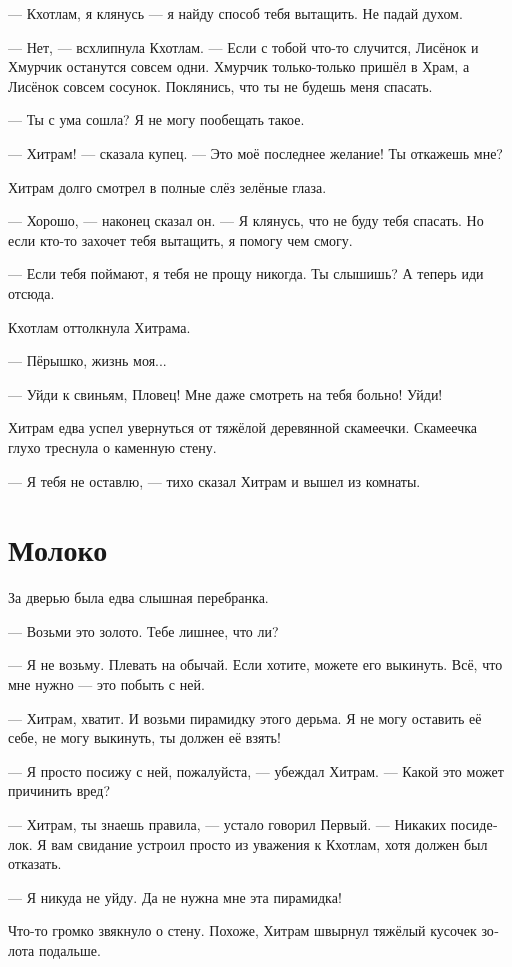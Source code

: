 \documentclass[a4paper,12pt,fleqn]{book}\usepackage{cooltooltips}\usepackage{polyglossia}\setdefaultlanguage{russian}\setotherlanguage{english}\defaultfontfeatures{Ligatures=TeX,Mapping=tex-text} \usepackage{xcolor}\definecolor{lightgray}{HTML}{bbbbbb}\color{lightgray}\newcommand{\ml}[3]{\textenglish{\textcolor{black}{#3}}}
\begin{document}
--- Кхотлам, я клянусь --- я найду способ тебя вытащить.
Не падай духом.

--- Нет, --- всхлипнула Кхотлам.
--- Если с тобой что-то случится, Лисёнок и Хмурчик останутся совсем одни.
Хмурчик только-только пришёл в Храм, а Лисёнок совсем сосунок.
Поклянись, что ты не будешь меня спасать.

--- Ты с ума сошла?
Я не могу пообещать такое.

--- Хитрам! --- сказала купец.
--- Это моё последнее желание!
Ты откажешь мне?

Хитрам долго смотрел в полные слёз зелёные глаза.

--- Хорошо, --- наконец сказал он.
--- Я клянусь, что не буду тебя спасать.
Но если кто-то захочет тебя вытащить, я помогу чем смогу.

--- Если тебя поймают, я тебя не прощу никогда.
Ты слышишь?
А теперь иди отсюда.

Кхотлам оттолкнула Хитрама.

--- Пёрышко, жизнь моя...

--- Уйди к свиньям, Пловец!
Мне даже смотреть на тебя больно!
Уйди!

Хитрам едва успел увернуться от тяжёлой деревянной скамеечки.
Скамеечка глухо треснула о каменную стену.

--- Я тебя не оставлю, --- тихо сказал Хитрам и вышел из комнаты.

\section{Молоко}

За дверью была едва слышная перебранка.

--- Возьми это золото.
Тебе лишнее, что ли?

--- Я не возьму.
Плевать на обычай.
Если хотите, можете его выкинуть.
Всё, что мне нужно --- это побыть с ней.

--- Хитрам, хватит.
И возьми пирамидку этого дерьма.
Я не могу оставить её себе, не могу выкинуть, ты должен её взять!

--- Я просто посижу с ней, пожалуйста, --- убеждал Хитрам.
--- Какой это может причинить вред?

--- Хитрам, ты знаешь правила, --- устало говорил Первый.
--- Никаких посиделок.
Я вам свидание устроил просто из уважения к Кхотлам, хотя должен был отказать.

--- Я никуда не уйду.
Да не нужна мне эта пирамидка!

Что-то громко звякнуло о стену.
Похоже, Хитрам швырнул тяжёлый кусочек золота подальше.
\end{document}
